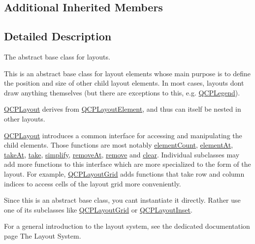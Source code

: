 \subsection*{Additional Inherited Members}


\subsection{Detailed Description}
The abstract base class for layouts. 

This is an abstract base class for layout elements whose main purpose is to define the position and size of other child layout elements. In most cases, layouts don\textquotesingle{}t draw anything themselves (but there are exceptions to this, e.\+g. \hyperlink{class_q_c_p_legend}{Q\+C\+P\+Legend}).

\hyperlink{class_q_c_p_layout}{Q\+C\+P\+Layout} derives from \hyperlink{class_q_c_p_layout_element}{Q\+C\+P\+Layout\+Element}, and thus can itself be nested in other layouts.

\hyperlink{class_q_c_p_layout}{Q\+C\+P\+Layout} introduces a common interface for accessing and manipulating the child elements. Those functions are most notably \hyperlink{class_q_c_p_layout_a39d3e9ef5d9b82ab1885ba1cb9597e56}{element\+Count}, \hyperlink{class_q_c_p_layout_afa73ca7d859f8a3ee5c73c9b353d2a56}{element\+At}, \hyperlink{class_q_c_p_layout_a5a79621fa0a6eabb8b520cfc04fb601a}{take\+At}, \hyperlink{class_q_c_p_layout_ada26cd17e56472b0b4d7fbbc96873e4c}{take}, \hyperlink{class_q_c_p_layout_a41e6ac049143866e8f8b4964efab01b2}{simplify}, \hyperlink{class_q_c_p_layout_a2403f684fee3ce47132faaeed00bb066}{remove\+At}, \hyperlink{class_q_c_p_layout_a6c58f537d8086f352576ab7c5b15d0bc}{remove} and \hyperlink{class_q_c_p_layout_a02883bdf2769b5b227f0232dba1ac4ee}{clear}. Individual subclasses may add more functions to this interface which are more specialized to the form of the layout. For example, \hyperlink{class_q_c_p_layout_grid}{Q\+C\+P\+Layout\+Grid} adds functions that take row and column indices to access cells of the layout grid more conveniently.

Since this is an abstract base class, you can\textquotesingle{}t instantiate it directly. Rather use one of its subclasses like \hyperlink{class_q_c_p_layout_grid}{Q\+C\+P\+Layout\+Grid} or \hyperlink{class_q_c_p_layout_inset}{Q\+C\+P\+Layout\+Inset}.

For a general introduction to the layout system, see the dedicated documentation page The Layout System. 

